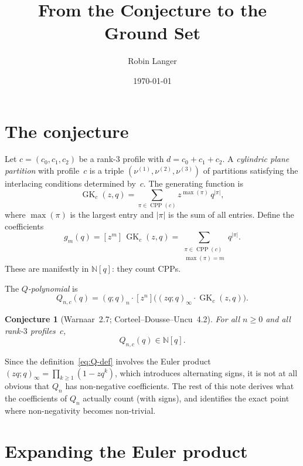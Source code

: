 \documentclass[11pt]{article}
\title{From the Conjecture to the Ground Set}
\author{Robin Langer}
\date{\today}
\newcommand{\N}{\mathbb{N}}
\newcommand{\GK}{\operatorname{GK}}
\newcommand{\CPP}{\operatorname{CPP}}
\newcommand{\qpoch}[2]{(#1;#2)_\infty}
\newcommand{\qpochn}[3]{(#1;#2)_{#3}}
\theoremstyle{plain}
\newtheorem{conjecture}[theorem]{Conjecture}
\theoremstyle{definition}
\begin{document}
\maketitle


\section{The conjecture}

Let $c = (c_0, c_1, c_2)$ be a rank-$3$ profile with
$d = c_0 + c_1 + c_2$.  A \emph{cylindric plane partition}
with profile~$c$ is a triple $(\nu^{(1)}, \nu^{(2)},
\nu^{(3)})$ of partitions satisfying the interlacing
conditions determined by~$c$.  The generating function is
\begin{equation}\label{eq:GK}
  \GK_c(z,q) = \sum_{\pi \in \CPP(c)}
    z^{\max(\pi)}\, q^{|\pi|},
\end{equation}
where $\max(\pi)$ is the largest entry and $|\pi|$ is the
sum of all entries.  Define the coefficients
\begin{equation}\label{eq:gm}
  g_m(q) = [z^m]\, \GK_c(z,q)
  = \sum_{\substack{\pi \in \CPP(c) \\[2pt] \max(\pi) = m}}
    q^{|\pi|}.
\end{equation}
These are manifestly in $\N[q]$: they count CPPs.

The \emph{$Q$-polynomial} is
\begin{equation}\label{eq:Q-def}
  Q_{n,c}(q)
  = \qpochn{q}{q}{n}
    \cdot [z^n]\bigl(\qpoch{zq}{q} \cdot \GK_c(z,q)\bigr).
\end{equation}

\begin{conjecture}[Warnaar~2.7; Corteel--Dousse--Uncu~4.2]
\label{conj:main}
For all $n \geq 0$ and all rank-$3$ profiles~$c$,
\[
  Q_{n,c}(q) \in \N[q].
\]
\end{conjecture}

Since the definition~\eqref{eq:Q-def} involves the Euler
product $\qpoch{zq}{q} = \prod_{k \geq 1}(1 - zq^k)$,
which introduces alternating signs, it is not at all
obvious that $Q_n$ has non-negative coefficients.  The
rest of this note derives what the coefficients of $Q_n$
actually count (with signs), and identifies the exact
point where non-negativity becomes non-trivial.


\section{Expanding the Euler product}
\end{document}
